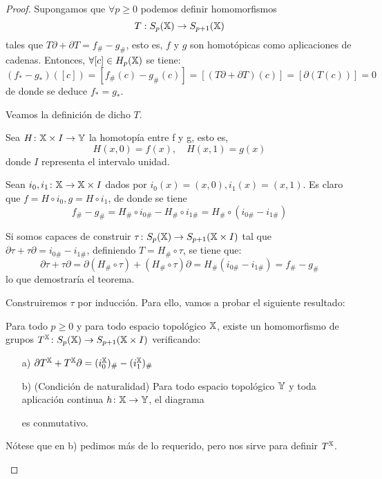 \begin{proof}
  Supongamos que $\forall p \geq 0$ podemos definir homomorfismos \[T: S_{p}({\mathbb X}) \to S_{p+1}({\mathbb X}) \] tales que $T\partial + \partial T = f_\# - g_\#$,
  esto es, $f$ y $g$ son homotópicas como aplicaciones de cadenas. Entonces, $\forall [c] \in H_p({\mathbb X})$ se tiene:
  \[ (f_* - g_*)([c]) = [f_\#(c) - g_\#(c)] = [(T\partial + \partial T)(c)] = [\partial(T(c))] = 0\]
  de donde se deduce $f_* = g_*$.

  Veamos la definición de dicho $T$.

  Sea $H \colon {\mathbb X} \times I \to {\mathbb Y}$ la homotopía entre f y g, esto es, \[H(x, 0) = f(x), \quad H(x, 1) = g(x)\] donde $I$ representa el intervalo unidad.

  Sean $i_0, i_1 \colon {\mathbb X} \to {\mathbb X} \times I$ dados por $i_0(x) = (x, 0), i_1(x) = (x, 1)$. Es claro que $f = H \circ i_0, g = H \circ i_1$, de donde
  se tiene \[ f_\# - g_\# = H_\# \circ i_{0\#} - H_\# \circ i_{1\#} = H_\# \circ (i_{0\#} - i_{1\#}) \]

  Si somos capaces de construir $\tau \colon S_{p}({\mathbb X}) \to S_{p+1}({\mathbb X} \times I)$ tal que $\partial \tau + \tau \partial = i_{0\#} - i_{1\#}$, definiendo
  $T = H_\# \circ \tau$, se tiene que:
  \[ \partial \tau + \tau \partial = \partial(H_\# \circ \tau) + (H_\# \circ \tau)\partial = H_\#(i_{0\#} - i_{1\#}) = f_\# - g_\#  \]
  lo que demostraría el teorema.

  Construiremos $\tau$ por inducción. Para ello, vamos a probar el siguiente resultado:
  \begin{lemma}
    Para todo $p \geq 0$ y para todo espacio topológico ${\mathbb X}$, existe un homomorfismo de grupos $T^{\mathbb X} \colon S_{p}({\mathbb X}) \to S_{p+1}({\mathbb X} \times I)$ verificando:
    \begin{itemize}
      \item[a)] $\partial T^{\mathbb X} + T^{\mathbb X} \partial = (i_0^{\mathbb X})_\# - (i_1^{\mathbb X})_\#$
      \item[b)] (Condición de naturalidad) Para todo espacio topológico ${\mathbb Y}$ y toda aplicación continua $h \colon {\mathbb X} \to {\mathbb Y}$, el diagrama

      \quad es conmutativo.
    \end{itemize}
    Nótese que en b) pedimos más de lo requerido, pero nos sirve para definir $T^{\mathbb X}$.
  \end{lemma}


\end{proof}
